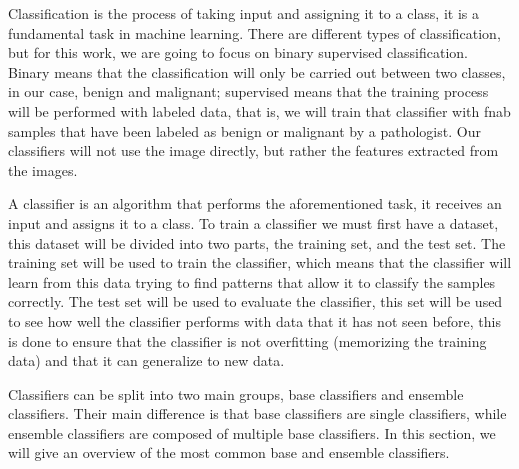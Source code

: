 

Classification is the process of taking input and assigning it to a class, it is a fundamental task in machine learning. There are different types of classification, but for this work, we are going to focus on binary supervised classification. Binary means that the classification will only be carried out between two classes, in our case, benign and malignant; supervised means that the training process will be performed with labeled data, that is, we will train that classifier with \ac{fnab} samples that have been labeled as benign or malignant by a pathologist. 
Our classifiers will not use the image directly, but rather the features extracted from the images. 

A classifier is an algorithm that performs the aforementioned task, it receives an input and assigns it to a class. To train a classifier we must first have a dataset, this dataset will be divided into two parts, the training set, and the test set. The training set will be used to train the classifier, which means that the classifier will learn from this data trying to find patterns that allow it to classify the samples correctly. The test set will be used to evaluate the classifier, this set will be used to see how well the classifier performs with data that it has not seen before, this is done to ensure that the classifier is not overfitting (memorizing the training data) and that it can generalize to new data.

Classifiers can be split into two main groups, base classifiers and ensemble classifiers. 
Their main difference is that base classifiers are single classifiers, while ensemble classifiers are composed of multiple base classifiers. In this section, we will give an overview of the most common base and ensemble classifiers.




